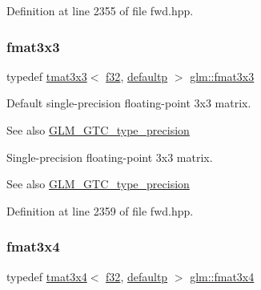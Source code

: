 Definition at line 2355 of file fwd.\+hpp.

\mbox{\label{group__gtc__type__precision_ga577209f19554f5291cc3d66dda9a4388}} 
\subsubsection{\texorpdfstring{fmat3x3}{fmat3x3}}
{\footnotesize\ttfamily typedef \mbox{\hyperlink{structglm_1_1tmat3x3}{tmat3x3}}$<$ \mbox{\hyperlink{group__gtc__type__precision_ga0ec999b57f5330d9021256e96038df04}{f32}}, \mbox{\hyperlink{namespaceglm_a0f04f086094c747d227af4425893f545a9d21ccd8b5a009ec7eb7677befc3bf51}{defaultp}} $>$ \mbox{\hyperlink{group__gtc__type__precision_ga577209f19554f5291cc3d66dda9a4388}{glm\+::fmat3x3}}}

Default single-\/precision floating-\/point 3x3 matrix. \begin{DoxySeeAlso}{See also}
\mbox{\hyperlink{group__gtc__type__precision}{G\+L\+M\+\_\+\+G\+T\+C\+\_\+type\+\_\+precision}}
\end{DoxySeeAlso}
Single-\/precision floating-\/point 3x3 matrix. \begin{DoxySeeAlso}{See also}
\mbox{\hyperlink{group__gtc__type__precision}{G\+L\+M\+\_\+\+G\+T\+C\+\_\+type\+\_\+precision}} 
\end{DoxySeeAlso}


Definition at line 2359 of file fwd.\+hpp.

\mbox{\label{group__gtc__type__precision_gad68d9daa91ef05b29e80e044931837cf}} 
\subsubsection{\texorpdfstring{fmat3x4}{fmat3x4}}
{\footnotesize\ttfamily typedef \mbox{\hyperlink{structglm_1_1tmat3x4}{tmat3x4}}$<$ \mbox{\hyperlink{group__gtc__type__precision_ga0ec999b57f5330d9021256e96038df04}{f32}}, \mbox{\hyperlink{namespaceglm_a0f04f086094c747d227af4425893f545a9d21ccd8b5a009ec7eb7677befc3bf51}{defaultp}} $>$ \mbox{\hyperlink{group__gtc__type__precision_gad68d9daa91ef05b29e80e044931837cf}{glm\+::fmat3x4}}}

